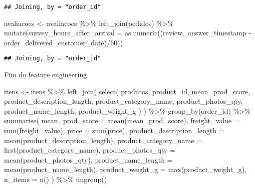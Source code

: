 \documentclass[
]{article}
\newenvironment{Shaded}{\begin{snugshade}}{\end{snugshade}}
\newcommand{\AttributeTok}[1]{\textcolor[rgb]{0.77,0.63,0.00}{#1}}
\newcommand{\DecValTok}[1]{\textcolor[rgb]{0.00,0.00,0.81}{#1}}
\newcommand{\FunctionTok}[1]{\textcolor[rgb]{0.00,0.00,0.00}{#1}}
\newcommand{\NormalTok}[1]{#1}
\newcommand{\OtherTok}[1]{\textcolor[rgb]{0.56,0.35,0.01}{#1}}
\newcommand{\SpecialCharTok}[1]{\textcolor[rgb]{0.00,0.00,0.00}{#1}}
\begin{document}
\begin{verbatim}
## Joining, by = "order_id"
\end{verbatim}

\begin{Shaded}
\begin{Highlighting}[]
\NormalTok{avaliacoes }\OtherTok{\textless{}{-}}\NormalTok{ avaliacoes }\SpecialCharTok{\%\textgreater{}\%}
  \FunctionTok{left\_join}\NormalTok{(pedidos) }\SpecialCharTok{\%\textgreater{}\%}
  \FunctionTok{mutate}\NormalTok{(}\AttributeTok{survey\_hours\_after\_arrival =} \FunctionTok{as.numeric}\NormalTok{((review\_answer\_timestamp }\SpecialCharTok{{-}}\NormalTok{ order\_delivered\_customer\_date)}\SpecialCharTok{/}\DecValTok{60}\NormalTok{))}
\end{Highlighting}
\end{Shaded}

\begin{verbatim}
## Joining, by = "order_id"
\end{verbatim}

Fim do feature engineering

\begin{Shaded}
\begin{Highlighting}[]
\NormalTok{itens }\OtherTok{\textless{}{-}}\NormalTok{ itens }\SpecialCharTok{\%\textgreater{}\%}
  \FunctionTok{left\_join}\NormalTok{(}
    \FunctionTok{select}\NormalTok{(}
\NormalTok{      produtos,}
\NormalTok{      product\_id,}
\NormalTok{      mean\_prod\_score,}
\NormalTok{      product\_description\_length,}
\NormalTok{      product\_category\_name,}
\NormalTok{      product\_photos\_qty,}
\NormalTok{      product\_name\_length,}
\NormalTok{      product\_weight\_g}
\NormalTok{    )}
\NormalTok{  ) }\SpecialCharTok{\%\textgreater{}\%}
  \FunctionTok{group\_by}\NormalTok{(order\_id) }\SpecialCharTok{\%\textgreater{}\%}
  \FunctionTok{summarise}\NormalTok{(}
    \AttributeTok{mean\_prod\_score =} \FunctionTok{mean}\NormalTok{(mean\_prod\_score),}
    \AttributeTok{freight\_value =} \FunctionTok{sum}\NormalTok{(freight\_value),}
    \AttributeTok{price =} \FunctionTok{sum}\NormalTok{(price),}
    \AttributeTok{product\_description\_length =} \FunctionTok{mean}\NormalTok{(product\_description\_length),}
    \AttributeTok{product\_category\_name =} \FunctionTok{first}\NormalTok{(product\_category\_name),}
    \AttributeTok{product\_photos\_qty =} \FunctionTok{mean}\NormalTok{(product\_photos\_qty),}
    \AttributeTok{product\_name\_length =} \FunctionTok{mean}\NormalTok{(product\_name\_length),}
    \AttributeTok{product\_weight\_g =} \FunctionTok{max}\NormalTok{(product\_weight\_g),}
    \AttributeTok{n\_items =} \FunctionTok{n}\NormalTok{()}
\NormalTok{  ) }\SpecialCharTok{\%\textgreater{}\%}
  \FunctionTok{ungroup}\NormalTok{()}
\end{Highlighting}
\end{Shaded}
\end{document}
